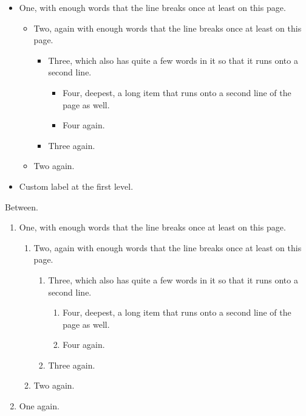 \documentclass{article}
\begin{document}
\begin{itemize}
\item One, with enough words that the line breaks once at least on this page.
\begin{itemize}
\item Two, again with enough words that the line breaks once at least on this page.
\begin{itemize}
\item Three, which also has quite a few words in it so that it runs onto a second line.
\begin{itemize}
\item Four, deepest, a long item that runs onto a second line of the page as well.
\item Four again.
\end{itemize}
\item Three again.
\end{itemize}
\item Two again.
\end{itemize}
\item[x] Custom label at the first level.
\end{itemize}
Between.
\begin{enumerate}
\item One, with enough words that the line breaks once at least on this page.
\begin{enumerate}
\item Two, again with enough words that the line breaks once at least on this page.
\begin{enumerate}
\item Three, which also has quite a few words in it so that it runs onto a second line.
\begin{enumerate}
\item Four, deepest, a long item that runs onto a second line of the page as well.
\item Four again.
\end{enumerate}
\item Three again.
\end{enumerate}
\item Two again.
\end{enumerate}
\item One again.
\end{enumerate}
\end{document}
